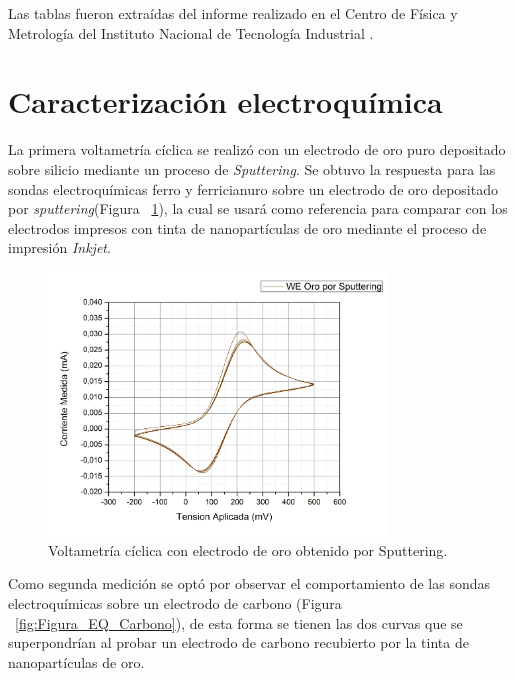 Las tablas fueron extraídas del informe realizado en el Centro de Física y Metrología del Instituto Nacional de Tecnología Industrial \cite{caracdimen}.
\newpage 
\section{Caracterización electroquímica}
La primera voltametría cíclica se realizó con un electrodo de oro puro depositado sobre silicio mediante un proceso de \textit{Sputtering}. Se obtuvo la respuesta para las sondas electroquímicas ferro y ferricianuro sobre un electrodo de oro depositado por \textit{sputtering}(Figura ~\ref{fig:Figura_EQ_Oro_Sputtering_1mm}), la cual se usará como referencia para comparar con los electrodos impresos con tinta de nanopartículas de oro mediante el proceso de impresión \textit{Inkjet}.

\begin{figure}[H]
  \centering
    \includegraphics[width=0.8\textwidth]{Figuras/Figura_EQ_Oro_Sputtering_1mm}
  \caption{Voltametría cíclica con electrodo de oro obtenido por Sputtering.}
  \label{fig:Figura_EQ_Oro_Sputtering_1mm}
\end{figure}

Como segunda medición se optó por observar el comportamiento de las sondas electroquímicas sobre un electrodo de carbono (Figura ~\ref{fig:Figura_EQ_Carbono}), de esta forma se tienen las dos curvas que se superpondrían al probar un electrodo de carbono recubierto por la tinta de nanopartículas de oro.

